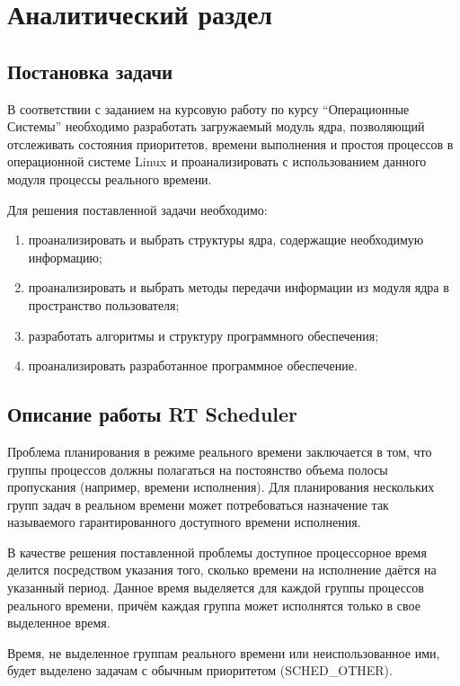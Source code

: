\section{Аналитический раздел}

\subsection{Постановка задачи}
В соответствии с заданием на курсовую работу по курсу ``Операционные Системы'' необходимо разработать загружаемый модуль ядра, позволяющий отслеживать состояния приоритетов, времени выполнения и простоя процессов в операционной системе Linux и проанализировать с использованием данного модуля процессы реального времени.

Для решения поставленной задачи необходимо:
\begin{enumerate}[leftmargin=1.6\parindent]
\item проанализировать и выбрать структуры ядра, содержащие необходимую информацию;
\item проанализировать и выбрать методы передачи информации из модуля ядра в пространство пользователя;
\item разработать алгоритмы и структуру программного обеспечения;
\item проанализировать разработанное программное обеспечение.
\end{enumerate}

\subsection{Описание работы RT Scheduler}
Проблема планирования в режиме реального времени заключается в том, что группы процессов должны полагаться на постоянство объема полосы пропускания (например, времени исполнения). Для планирования нескольких групп задач в реальном времени может потребоваться назначение так называемого гарантированного доступного времени исполнения. \cite{linuxkerneldocs}

В качестве решения поставленной проблемы доступное процессорное время делится посредством указания того, сколько времени на исполнение даётся на указанный период. Данное время выделяется для каждой группы процессов реального времени, причём каждая группа может исполнятся только в свое выделенное время. \cite{linuxkerneldocs}

Время, не выделенное группам реального времени или неиспользованное ими, будет выделено задачам с обычным приоритетом (SCHED\_OTHER). \cite{linuxkerneldocs}

